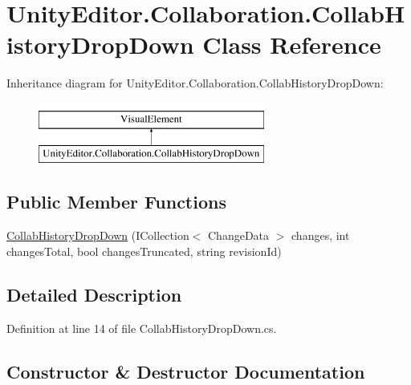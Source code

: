 \hypertarget{class_unity_editor_1_1_collaboration_1_1_collab_history_drop_down}{}\section{Unity\+Editor.\+Collaboration.\+Collab\+History\+Drop\+Down Class Reference}
\label{class_unity_editor_1_1_collaboration_1_1_collab_history_drop_down}
Inheritance diagram for Unity\+Editor.\+Collaboration.\+Collab\+History\+Drop\+Down\+:\begin{figure}[H]
\begin{center}
\leavevmode
\includegraphics[height=2.000000cm]{class_unity_editor_1_1_collaboration_1_1_collab_history_drop_down}
\end{center}
\end{figure}
\subsection*{Public Member Functions}
\begin{DoxyCompactItemize}
\item 
\mbox{\hyperlink{class_unity_editor_1_1_collaboration_1_1_collab_history_drop_down_aaee64531a66eba063c6be582401a69d1}{Collab\+History\+Drop\+Down}} (I\+Collection$<$ Change\+Data $>$ changes, int changes\+Total, bool changes\+Truncated, string revision\+Id)
\end{DoxyCompactItemize}


\subsection{Detailed Description}


Definition at line 14 of file Collab\+History\+Drop\+Down.\+cs.



\subsection{Constructor \& Destructor Documentation}
\mbox{\label{class_unity_editor_1_1_collaboration_1_1_collab_history_drop_down_aaee64531a66eba063c6be582401a69d1}} 
